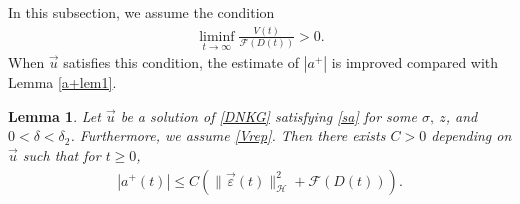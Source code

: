 \documentclass[reqno]{amsart}
\theoremstyle{plain}
\newtheorem{lemma}[theorem]{Lemma}
\theoremstyle{definition}
\numberwithin{equation}{section}
\newcommand{\1}{\mathbbm{1}}
\begin{document}
In this subsection, we assume the condition
\begin{align}\label{Vrep}
\liminf_{t\to \infty}\frac{V(t)}{\mathcal{F}(D(t))}> 0.
\end{align}
When $\vec{u}$ satisfies this condition, the estimate of $|a^+|$ is improved compared with Lemma \ref{a+lem1}.
\begin{lemma}\label{a+lem2}
Let $\vec{u}$ be a solution of \eqref{DNKG} satisfying \eqref{sa} for some $\sigma,\ z$, and $0<\delta<\delta_2$. Furthermore, we assume \eqref{Vrep}. Then there exists $C>0$ depending on $\vec{u}$ such that for $t\geq 0$,
\begin{align}\label{newa+es}
|a^+(t)|\leq C\left(\|\vec{\varepsilon}(t)\|_{\mathcal{H}}^2+\mathcal{F}(D(t))\right).
\end{align}
\end{lemma}
\end{document}
